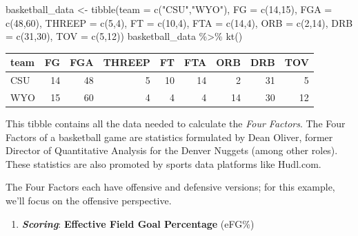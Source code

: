 \documentclass[
  11pt,
]{book}
\newenvironment{Shaded}{\begin{snugshade}}{\end{snugshade}}
\newcommand{\AttributeTok}[1]{\textcolor[rgb]{0.77,0.63,0.00}{#1}}
\newcommand{\DecValTok}[1]{\textcolor[rgb]{0.00,0.00,0.81}{#1}}
\newcommand{\FunctionTok}[1]{\textcolor[rgb]{0.00,0.00,0.00}{#1}}
\newcommand{\NormalTok}[1]{#1}
\newcommand{\OtherTok}[1]{\textcolor[rgb]{0.56,0.35,0.01}{#1}}
\newcommand{\SpecialCharTok}[1]{\textcolor[rgb]{0.00,0.00,0.00}{#1}}
\newcommand{\StringTok}[1]{\textcolor[rgb]{0.31,0.60,0.02}{#1}}
\providecommand{\tightlist}{%
  \setlength{\itemsep}{0pt}\setlength{\parskip}{0pt}}
\theoremstyle{definition}
\theoremstyle{definition}
\theoremstyle{definition}
\theoremstyle{definition}
\theoremstyle{remark}
\begin{document}
\begin{Shaded}
\begin{Highlighting}[]
\NormalTok{basketball\_data }\OtherTok{\textless{}{-}} \FunctionTok{tibble}\NormalTok{(}\AttributeTok{team =} \FunctionTok{c}\NormalTok{(}\StringTok{"CSU"}\NormalTok{,}\StringTok{"WYO"}\NormalTok{), }\AttributeTok{FG =} \FunctionTok{c}\NormalTok{(}\DecValTok{14}\NormalTok{,}\DecValTok{15}\NormalTok{), }\AttributeTok{FGA =} \FunctionTok{c}\NormalTok{(}\DecValTok{48}\NormalTok{,}\DecValTok{60}\NormalTok{), }
                          \AttributeTok{THREEP =} \FunctionTok{c}\NormalTok{(}\DecValTok{5}\NormalTok{,}\DecValTok{4}\NormalTok{), }\AttributeTok{FT =} \FunctionTok{c}\NormalTok{(}\DecValTok{10}\NormalTok{,}\DecValTok{4}\NormalTok{), }\AttributeTok{FTA =} \FunctionTok{c}\NormalTok{(}\DecValTok{14}\NormalTok{,}\DecValTok{4}\NormalTok{), }
                          \AttributeTok{ORB =} \FunctionTok{c}\NormalTok{(}\DecValTok{2}\NormalTok{,}\DecValTok{14}\NormalTok{), }\AttributeTok{DRB =} \FunctionTok{c}\NormalTok{(}\DecValTok{31}\NormalTok{,}\DecValTok{30}\NormalTok{), }\AttributeTok{TOV =} \FunctionTok{c}\NormalTok{(}\DecValTok{5}\NormalTok{,}\DecValTok{12}\NormalTok{))}
\NormalTok{basketball\_data }\SpecialCharTok{\%\textgreater{}\%} \FunctionTok{kt}\NormalTok{()}
\end{Highlighting}
\end{Shaded}

\begin{table}[H]
\centering
\begin{tabular}{lrrrrrrrr}
\toprule
team & FG & FGA & THREEP & FT & FTA & ORB & DRB & TOV\\
\midrule
CSU & 14 & 48 & 5 & 10 & 14 & 2 & 31 & 5\\
WYO & 15 & 60 & 4 & 4 & 4 & 14 & 30 & 12\\
\bottomrule
\end{tabular}
\end{table}

This tibble contains all the data needed to calculate the \emph{Four Factors}. The Four Factors of a basketball game are statistics formulated by Dean Oliver, former Director of Quantitative Analysis for the Denver Nuggets (among other roles). These statistics are also promoted by sports data platforms like Hudl.com.

The Four Factors each have offensive and defensive versions; for this example, we'll focus on the offensive perspective.

\begin{enumerate}
\def\labelenumi{\arabic{enumi}.}
\tightlist
\item
  \textbf{\emph{Scoring}}: \textbf{Effective Field Goal Percentage} (eFG\%)
\end{enumerate}
\end{document}
